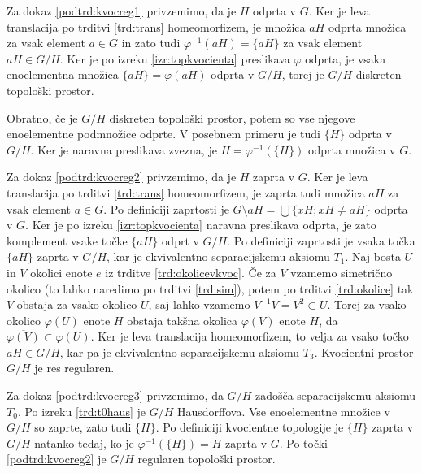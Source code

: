 \documentclass[mat1]{fmfdelo}
\newcommand{\closure}[1]{\overline{#1}}
\begin{document}
\begin{dokaz}
Za dokaz \ref{podtrd:kvocreg1} privzemimo, da je $H$ odprta v $G$. Ker je leva translacija po trditvi \ref{trd:trans} homeomorfizem, je množica $aH$ odprta množica za vsak element $a \in G$ in zato tudi $\varphi^{-1}(aH) = \lbrace aH \rbrace$ za vsak element $aH \in G/H$. Ker je po izreku \ref{izr:topkvocienta} preslikava $\varphi$ odprta, je vsaka enoelementna množica $\lbrace aH \rbrace = \varphi(aH)$ odprta v $G/H$, torej je $G/H$ diskreten topološki prostor.

Obratno, če je $G/H$ diskreten topološki prostor, potem so vse njegove eno\-e\-le\-ment\-ne podmnožice odprte. V posebnem primeru je tudi $\lbrace H \rbrace$ odprta v $G/H$. Ker je naravna preslikava zvezna, je $H = \varphi^{-1}(\lbrace H \rbrace)$ odprta množica v $G$.

Za dokaz \ref{podtrd:kvocreg2} privzemimo, da je $H$ zaprta v $G$. Ker je leva translacija po trditvi \ref{trd:trans} homeomorfizem, je zaprta tudi množica $aH$ za vsak element $a \in G$. Po definiciji zaprtosti je $G\setminus aH = \bigcup \lbrace xH ; xH \neq aH \rbrace$ odprta v $G$. Ker je po izreku \ref{izr:topkvocienta} naravna preslikava odprta, je zato komplement vsake točke $\lbrace aH \rbrace$ odprt v $G/H$. Po definiciji zaprtosti je vsaka točka $\lbrace aH \rbrace$ zaprta v $G/H$, kar je ekvivalentno separacijskemu aksiomu $T_1$. Naj bosta $U$ in $V$ okolici enote $e$ iz trditve \ref{trd:okolicevkvoc}. Če za $V$ vzamemo simetrično okolico (to lahko naredimo po trditvi \ref{trd:sim}), potem po trditvi \ref{trd:okolice} tak $V$ obstaja za vsako okolico $U$, saj lahko vzamemo $V^{-1}V = V^2 \subset U$. Torej za vsako okolico $\varphi(U)$ enote $H$ obstaja takšna okolica $\varphi(V)$ enote $H$, da $\closure{\varphi(V)} \subset \varphi(U)$. Ker je leva translacija homeomorfizem, to velja za vsako točko $aH \in G/H$, kar pa je ekvivalentno separacijskemu aksiomu $T_3$. Kvocientni prostor $G/H$ je res regularen.

Za dokaz \ref{podtrd:kvocreg3} privzemimo, da $G/H$ zadošča separacijskemu aksiomu $T_0$. Po izreku \ref{trd:t0haus} je $G/H$ Hausdorffova. Vse enoelementne množice v $G/H$ so zaprte, zato tudi $\lbrace H \rbrace$. Po definiciji kvocientne topologije je $\lbrace H \rbrace$ zaprta v $G/H$ natanko tedaj, ko je $\varphi^{-1}(\lbrace H \rbrace) = H$ zaprta v $G$. Po točki \ref{podtrd:kvocreg2} je $G/H$ regularen topološki prostor.
\end{dokaz}
\end{document}
